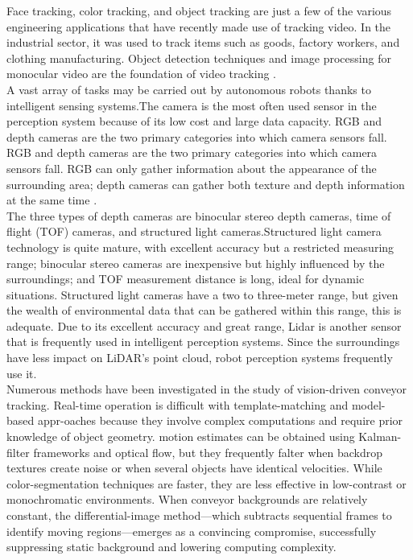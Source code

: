 \documentclass[12pt]{article}
\begin{document}
Face tracking, color tracking, and object tracking are just a few of the various engineering applications that have recently made use of tracking video.  In the industrial sector, it was used to track items such as goods, factory workers, and clothing manufacturing.  Object detection techniques and image processing for monocular video are the foundation of video tracking \cite{ref12}.\\

A vast array of tasks may be carried out by autonomous robots thanks to intelligent sensing systems.The camera is the most often used sensor in the perception system because of its low cost and large data capacity. RGB and depth cameras are the two primary categories into which camera sensors fall.  RGB and depth cameras are the two primary categories into which camera sensors fall.  RGB can only gather information about the appearance of the surrounding area; depth cameras can gather both texture and depth information at the same time \cite{ref12}.\\

The three types of depth cameras are binocular stereo depth cameras, time of flight (TOF) cameras, and structured light cameras.Structured light camera technology is quite mature, with excellent accuracy but a restricted measuring range; binocular stereo cameras are inexpensive but highly influenced by the surroundings; and TOF measurement distance is long, ideal for dynamic situations.  Structured light cameras have a two to three-meter range, but given the wealth of environmental data that can be gathered within this range, this is adequate. Due to its excellent accuracy and great range, Lidar is another sensor that is frequently used in intelligent perception systems.  Since the surroundings have less impact on LiDAR's point cloud, robot perception systems frequently use it\cite{ref12}.\\

Numerous methods have been investigated in the study of vision-driven conveyor tracking.  Real-time operation is difficult with template-matching and model-based appr-oaches because they involve complex computations and require prior knowledge of object geometry.  motion estimates can be obtained using Kalman-filter frameworks and optical flow, but they frequently falter when backdrop textures create noise or when several objects have identical velocities.  While color-segmentation techniques are faster, they are less effective in low-contrast or monochromatic environments.  When conveyor backgrounds are relatively constant, the differential-image method—which subtracts sequential frames to identify moving regions—emerges as a convincing compromise, successfully suppressing static background and lowering computing complexity\cite{ref12}.\\
\end{document}
